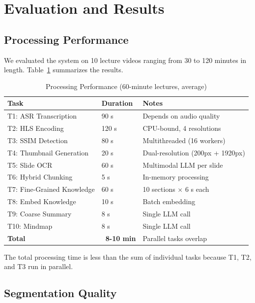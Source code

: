 \section{Evaluation and Results}
\label{sec:evaluation}

\subsection{Processing Performance}

We evaluated the system on 10 lecture videos ranging from 30 to 120 minutes in length. Table~\ref{tab:processing-performance} summarizes the results.

\begin{table}[H]
    \centering
    \caption{Processing Performance (60-minute lectures, average)}
    \label{tab:processing-performance}
    \begin{tabular}{@{}lll@{}}
        \toprule
        \textbf{Task} & \textbf{Duration} & \textbf{Notes} \\ \midrule
        T1: ASR Transcription & 90 s & Depends on audio quality \\
        T2: HLS Encoding & 120 s & CPU-bound, 4 resolutions \\
        T3: SSIM Detection & 80 s & Multithreaded (16 workers) \\
        T4: Thumbnail Generation & 20 s & Dual-resolution (200px + 1920px) \\
        T5: Slide OCR & 60 s & Multimodal LLM per slide \\
        T6: Hybrid Chunking & 5 s & In-memory processing \\
        T7: Fine-Grained Knowledge & 60 s & 10 sections $\times$ 6 s each \\
        T8: Embed Knowledge & 10 s & Batch embedding \\
        T9: Coarse Summary & 8 s & Single LLM call \\
        T10: Mindmap & 8 s & Single LLM call \\ \midrule
        \textbf{Total} & \textbf{~8-10 min} & Parallel tasks overlap \\ \bottomrule
    \end{tabular}
\end{table}

The total processing time is less than the sum of individual tasks because T1, T2, and T3 run in parallel.

\subsection{Segmentation Quality}

